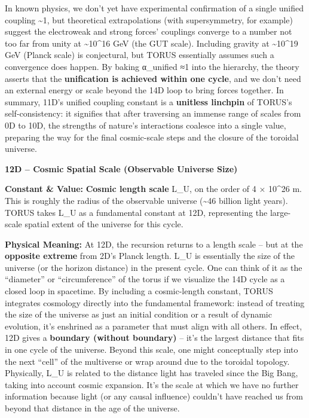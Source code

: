 In known physics, we don't yet have experimental confirmation of a
single unified coupling \textasciitilde{}1, but theoretical
extrapolations (with supersymmetry, for example) suggest the electroweak
and strong forces' couplings converge to a number not too far from unity
at \textasciitilde{}10\^{}16 GeV (the GUT scale)​. Including gravity at
\textasciitilde{}10\^{}19 GeV (Planck scale) is conjectural, but TORUS
essentially assumes such a convergence does happen. By baking α\_unified
≈1 into the hierarchy, the theory asserts that the \textbf{unification
is achieved within one cycle}, and we don't need an external energy or
scale beyond the 14D loop to bring forces together. In summary, 11D's
unified coupling constant is a \textbf{unitless linchpin} of TORUS's
self-consistency: it signifies that after traversing an immense range of
scales from 0D to 10D, the strengths of nature's interactions coalesce
into a single value, preparing the way for the final cosmic-scale steps
and the closure of the toroidal universe.

\textbf{12D -- Cosmic Spatial Scale (Observable Universe Size)}

\textbf{Constant \& Value:} \textbf{Cosmic length scale} L\_U, on the
order of 4 × 10\^{}26 m​. This is roughly the radius of the observable
universe (\textasciitilde{}46 billion light years). TORUS takes L\_U as
a fundamental constant at 12D, representing the large-scale spatial
extent of the universe for this cycle.

\textbf{Physical Meaning:} At 12D, the recursion returns to a length
scale -- but at the \textbf{opposite extreme} from 2D's Planck length.
L\_U is essentially the size of the universe (or the horizon distance)
in the present cycle​. One can think of it as the ``diameter'' or
``circumference'' of the torus if we visualize the 14D cycle as a closed
loop in spacetime​. By including a cosmic-length constant, TORUS
integrates cosmology directly into the fundamental framework: instead of
treating the size of the universe as just an initial condition or a
result of dynamic evolution, it's enshrined as a parameter that must
align with all others. In effect, 12D gives a \textbf{boundary (without
boundary)} -- it's the largest distance that fits in one cycle of the
universe. Beyond this scale, one might conceptually step into the next
``cell'' of the multiverse or wrap around due to the toroidal topology.
Physically, L\_U is related to the distance light has traveled since the
Big Bang, taking into account cosmic expansion. It's the scale at which
we have no further information because light (or any causal influence)
couldn't have reached us from beyond that distance in the age of the
universe.

